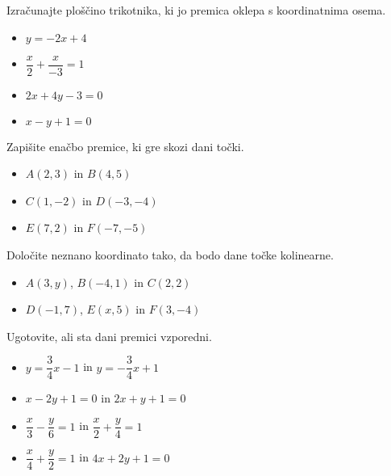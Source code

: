             \begin{naloga}
                Izračunajte ploščino trikotnika, ki jo premica oklepa s koordinatnima osema.
                \begin{multicols}{2}   
                \begin{itemize}
                        \item $y=-2x+4$
                        \item $\dfrac{x}{2}+\dfrac{x}{-3}=1$
                        \item $2x+4y-3=0$
                        \item $x-y+1=0$ 
                    \end{itemize}
                \end{multicols}
            \end{naloga}

        


        
            \begin{naloga}
                Zapišite enačbo premice, ki gre skozi dani točki.
                    \begin{itemize}
                        \item $A(2,3)$ in $B(4,5)$ 
                        \item $C(1,-2)$ in $D(-3,-4)$ 
                        \item $E(7,2)$ in $F(-7,-5)$ 
                    \end{itemize}
            \end{naloga}

            \begin{naloga}
                Določite neznano koordinato tako, da bodo dane točke kolinearne.
                    \begin{itemize}
                        \item $A(3,y)$, $B(-4,1)$ in $C(2,2)$ 
                        \item $D(-1,7)$, $E(x,5)$ in $F(3,-4)$ 
                    \end{itemize}
            \end{naloga}

        


        
            \begin{naloga}
                Ugotovite, ali sta dani premici vzporedni.
                    \begin{itemize}
                        \item $y=\dfrac{3}{4}x-1$ in $y=-\dfrac{3}{4}x+1$ 
                        \item $x-2y+1=0$ in $2x+y+1=0$ 
                        \item $\dfrac{x}{3}-\dfrac{y}{6}=1$ in $\dfrac{x}{2}+\dfrac{y}{4}=1$ 
                        \item $\dfrac{x}{4}+\dfrac{y}{2}=1$ in $4x+2y+1=0$ 

                    \end{itemize}
            \end{naloga}


